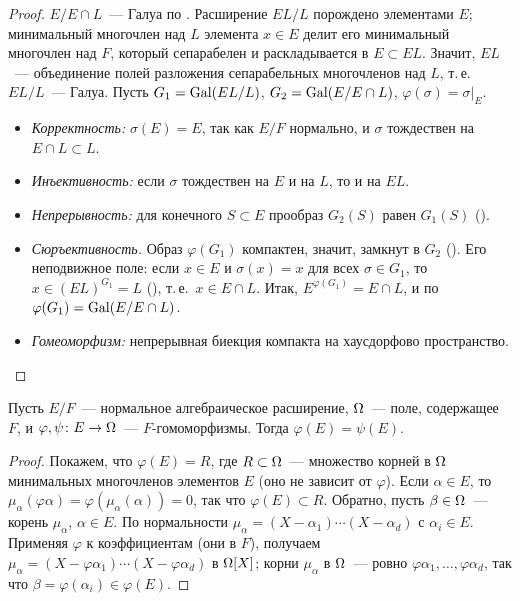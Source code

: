 \begin{proof}
$E/E\cap L$~--- Галуа по . Расширение $EL/L$ порождено элементами $E$; минимальный многочлен над $L$ элемента $x\in E$
делит его минимальный многочлен над $F$, который сепарабелен и раскладывается в $E\subset EL$. Значит, $EL$~---
объединение полей разложения сепарабельных многочленов над $L$, т.\,е.\ $EL/L$~--- Галуа. Пусть
$G_1=\operatorname{Gal}(EL/L)$, $G_2=\operatorname{Gal}(E/E\cap L)$, $\varphi(\sigma)=\sigma|_E$.
\begin{itemize}[leftmargin=*]
\item \emph{Корректность:} $\sigma(E)=E$, так как $E/F$ нормально, и $\sigma$ тождествен на $E\cap L\subset L$.
\item \emph{Инъективность:} если $\sigma$ тождествен на $E$ и на $L$, то и на $EL$.
\item \emph{Непрерывность:} для конечного $S\subset E$ прообраз $G_2(S)$ равен $G_1(S)$ ().
\item \emph{Сюръективность.} Образ $\varphi(G_1)$ компактен, значит, замкнут в $G_2$ (). Его неподвижное поле:
если $x\in E$ и $\sigma(x)=x$ для всех $\sigma\in G_1$, то $x\in(EL)^{G_1}=L$ (), т.\,е.\ $x\in E\cap L$. Итак,
$E^{\varphi(G_1)}=E\cap L$, и по  $\varphi(G_1)=\operatorname{Gal}(E/E\cap L)$.
\item \emph{Гомеоморфизм:} непрерывная биекция компакта на хаусдорфово пространство.\qedhere
\end{itemize}
\end{proof}

\begin{lemma}[7.15a]
Пусть $E/F$~--- нормальное алгебраическое расширение, $\Omega$~--- поле, содержащее $F$, и $\varphi,\psi\colon E\to\Omega$~---
$F$-гомоморфизмы. Тогда $\varphi(E)=\psi(E)$.
\end{lemma}

\begin{proof}
Покажем, что $\varphi(E)=R$, где $R\subset\Omega$~--- множество корней в $\Omega$ минимальных многочленов элементов $E$ (оно не
зависит от $\varphi$). Если $\alpha\in E$, то $\mu_\alpha(\varphi\alpha)=\varphi(\mu_\alpha(\alpha))=0$, так что
$\varphi(E)\subset R$. Обратно, пусть $\beta\in\Omega$~--- корень $\mu_\alpha$, $\alpha\in E$. По нормальности
$\mu_\alpha=(X-\alpha_1)\cdots(X-\alpha_d)$ с $\alpha_i\in E$. Применяя $\varphi$ к коэффициентам (они в $F$), получаем
$\mu_\alpha=(X-\varphi\alpha_1)\cdots(X-\varphi\alpha_d)$ в $\Omega[X]$; корни $\mu_\alpha$ в $\Omega$~--- ровно
$\varphi\alpha_1,\dots,\varphi\alpha_d$, так что $\beta=\varphi(\alpha_i)\in\varphi(E)$.
\end{proof}

